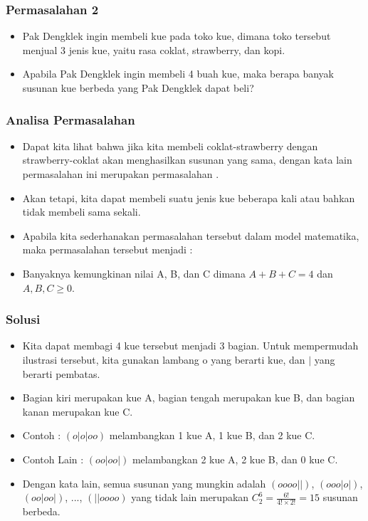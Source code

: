 \begin{frame}
\frametitle{Permasalahan 2}
\begin{itemize}
  \item Pak Dengklek ingin membeli kue pada toko kue, dimana toko tersebut menjual 3 jenis kue, yaitu rasa coklat, strawberry, dan kopi.
  \item Apabila Pak Dengklek ingin membeli 4 buah kue, maka berapa banyak susunan kue berbeda yang Pak Dengklek dapat beli?
\end{itemize}
\end{frame}

\begin{frame}
\frametitle{Analisa Permasalahan}
\begin{itemize}
  \item Dapat kita lihat bahwa jika kita membeli coklat-strawberry dengan strawberry-coklat akan menghasilkan susunan yang sama, dengan kata lain permasalahan ini merupakan permasalahan .
  \item Akan tetapi, kita dapat membeli suatu jenis kue beberapa kali atau bahkan tidak membeli sama sekali.
  \item Apabila kita sederhanakan permasalahan tersebut dalam model matematika, maka permasalahan tersebut menjadi :
  \item Banyaknya kemungkinan nilai A, B, dan C dimana $A + B + C = 4$ dan $A,B,C \geq 0$.
\end{itemize}
\end{frame}

\begin{frame}
\frametitle{Solusi}
\begin{itemize}
  \item Kita dapat membagi 4 kue tersebut menjadi 3 bagian. Untuk mempermudah ilustrasi tersebut, kita gunakan lambang o yang berarti kue, dan $|$ yang berarti pembatas.
  \item Bagian kiri merupakan kue A, bagian tengah merupakan kue B, dan bagian kanan merupakan kue C.
  \item Contoh : $(o|o|oo)$ melambangkan 1 kue A, 1 kue B, dan 2 kue C.
  \item Contoh Lain : $(oo|oo|)$ melambangkan 2 kue A, 2 kue B, dan 0 kue C.
  \item Dengan kata lain, semua susunan yang mungkin adalah $(oooo||)$, $(ooo|o|)$, $(oo|oo|)$, ..., $(||oooo)$ yang tidak lain merupakan $C^{6}_{2} = \frac{6!}{4! \times 2!} = 15$ susunan berbeda.
\end{itemize}
\end{frame}

